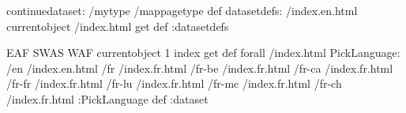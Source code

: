 \begin{ingrid}
continuedataset:
/mytype /mappagetype def
datasetdefs:
/index.en.html currentobject /index.html get def
:datasetdefs

{ EAF  SWAS  WAF } { currentobject 1 index get def } forall
/index.html {
PickLanguage:
/en /index.en.html
/fr /index.fr.html
/fr-be /index.fr.html
/fr-ca /index.fr.html
/fr-fr /index.fr.html
/fr-lu /index.fr.html
/fr-mc /index.fr.html
/fr-ch /index.fr.html
:PickLanguage
} def
:dataset
\end{ingrid}
